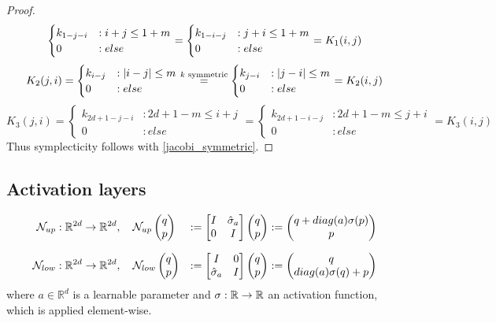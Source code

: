\documentclass[twoside,a4paper]{article}
\begin{document}
\begin{proof}
\begin{equation*}
\begin{cases}
			k_{1-j-i} & : i+j \leq 1+m \\
			0 & : else
		\end{cases} = \begin{cases}
			k_{1-i-j} & : j+i \leq 1+m \\
			0 & : else
		\end{cases} = K_1(i,j) \\[20pt]
	\end{equation*}
	\begin{equation*}
		K_2(j,i) = \begin{cases}
			k_{i-j} & : \left|{i-j}\right| \leq m \\
			0 & : else
		\end{cases} \stackrel{k \text{ symmetric}}{=} \begin{cases}
			k_{j-i} & : \left|{j-i}\right| \leq m \\
			0 & : else
		\end{cases} = K_2(i,j) \\[20pt]
	\end{equation*}
	\begin{equation*}
		K_3(j,i) = \begin{cases}
			k_{2d+1-j-i} & : 2d+1-m \leq i+j \\
			0 & : else
		\end{cases} = \begin{cases}
			k_{2d+1-i-j} & : 2d+1-m \leq j+i \\
			0 & : else
		\end{cases} = K_3(i,j)
	\end{equation*}
	Thus symplecticity follows with \cref{jacobi_symmetric}.
\end{proof}

\subsection{Activation layers}

\begin{alignat*}{2}
	\mathcal{N}_{up} &: \mathbb{R}^{2d} \to \mathbb{R}^{2d},
	\quad \mathcal{N}_{up} \begin{pmatrix} q \\ p \end{pmatrix} &:= \begin{bmatrix} I & {\hat{\sigma}_a} \\ 0 & I \end{bmatrix} \begin{pmatrix} q \\ p \end{pmatrix}
	:= \begin{pmatrix}
		q + diag(a)\sigma(p) \\
		p
	\end{pmatrix} \\[7pt]
	\mathcal{N}_{low} &: \mathbb{R}^{2d} \to \mathbb{R}^{2d},
	\quad \mathcal{N}_{low} \begin{pmatrix} q \\ p \end{pmatrix} &:= \begin{bmatrix} I & 0 \\ {\hat{\sigma}_a} & I \end{bmatrix} \begin{pmatrix} q \\ p \end{pmatrix}
	:= \begin{pmatrix}
		q \\
		diag(a)\sigma(q) + p
	\end{pmatrix}
\end{alignat*}
where $a \in \mathbb{R}^d$ is a learnable parameter and 
$\sigma : \mathbb{R} \to \mathbb{R}$ an activation function,
which is applied element-wise.
\end{document}

